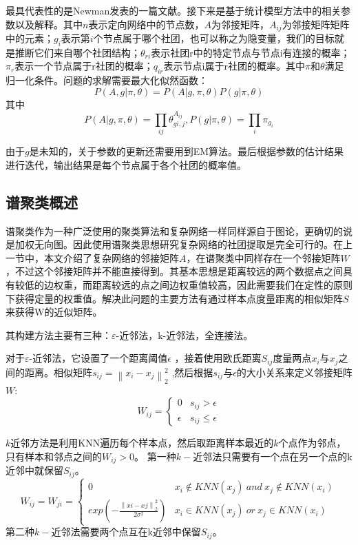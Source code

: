 \documentclass[a4paper,12pt,openany,oneside,utf-8]{ctexbook}
\begin{document}
    最具代表性的是Newman\cite{ref16}发表的一篇文献。接下来是基于统计模型方法中的相关参数以及解释。其中$n$表示定向网络中的节点数，$A$为邻接矩阵，$A_{ij}$为邻接矩阵矩阵中的元素；$g_i$表示第$i$个节点属于哪个社团，也可以称之为隐变量，我们的目标就是推断它们来自哪个社团结构；$\theta_{r i}$表示社团r中的特定节点与节点i有连接的概率；$\pi_r$表示一个节点属于r社团的概率；$q_{i r}$表示节点i属于r社团的概率。其中$\pi$和$\theta$满足归一化条件。问题的求解需要最大化似然函数：
    \begin{equation}
          P(A,g|\pi,\theta )=P(A|g,\pi,\theta)P(g|\pi,\theta)
    \end{equation}
    其中
    \begin{equation}
        P(A|g,\pi,\theta)=\prod_{i j}\theta_{gi,j}^{A_{i j}},P(g|\pi,\theta)=\prod_{i}\pi_{g_i}
    \end{equation}
    
    由于$g$是未知的，关于参数的更新还需要用到EM算法。最后根据参数的估计结果进行迭代，输出结果是每个节点属于各个社团的概率值。
    
    \subsection{谱聚类概述}
    
    谱聚类\cite{ref23}作为一种广泛使用的聚类算法和复杂网络一样同样源自于图论，更确切的说是加权无向图。因此使用谱聚类思想研究复杂网络的社团提取是完全可行的。在上一节中，本文介绍了复杂网络的邻接矩阵$A$，在谱聚类中同样存在一个邻接矩阵$W$，不过这个邻接矩阵并不能直接得到。其基本思想是距离较远的两个数据点之间具有较低的边权重，而距离较远的点之间边权重值较高，因此需要我们在定性的原则下获得定量的权重值。解决此问题的主要方法有通过样本点度量距离的相似矩阵$S$来获得W的近似矩阵。
    
    其构建方法主要有三种：$\varepsilon $-近邻法，k-近邻法，全连接法。
    
    对于$\varepsilon $-近邻法，它设置了一个距离阈值$\epsilon$ ，接着使用欧氏距离$S_{ij}$度量两点$x_i$与$x_j$之间的距离。相似矩阵$s_{ij}=\left \| x_i-x_j\right \|_2^2$
    ,然后根据$s_{ij}$与$\epsilon$的大小关系来定义邻接矩阵$W$:
    \begin{equation}
            W_{i j}=\left\{\begin{matrix}
    0 & s_{ij}>\epsilon \\ 
    \epsilon&s_{ij}\leq \epsilon
    \end{matrix}\right.
    \end{equation}
    
    $k$近邻方法是利用KNN遍历每个样本点，然后取距离样本最近的$k$个点作为邻点，只有样本和邻点之间的$W_{i j}>0$。
    第一种$k-$近邻法只需要有一个点在另一个点的k近邻中就保留$S_{i j}$。
    \begin{equation}
        W_{i j}=W_{j i}=\left\{\begin{matrix}
    0 & x_i\notin KNN(x_j)\  and \ x_j \notin KNN(x_i)\\ 
     exp(-\frac{\left \| xi-xj\right \|^2_2}{2\sigma^2})& x_i \in KNN(x_j)\ or\ x_j\in KNN(x_i) 
    \end{matrix}\right.
    \end{equation}
    第二种$k-$近邻法需要两个点互在k近邻中保留$S_{i j}$。
    
\end{document}

